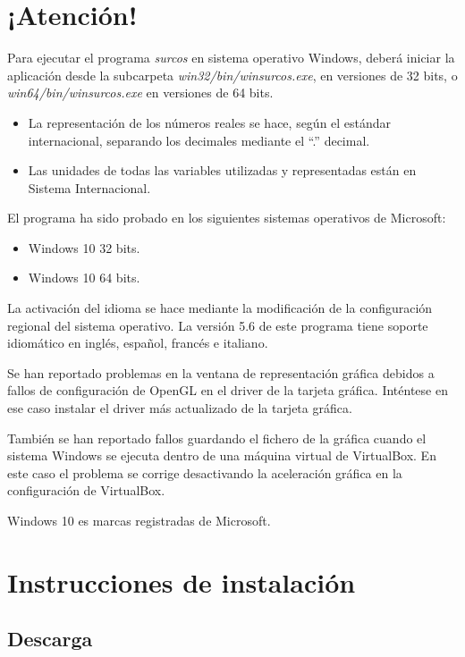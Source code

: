 \chapter*{¡Atención!}

Para ejecutar el programa \emph{surcos} en sistema operativo Windows, deberá
iniciar la aplicación desde la subcarpeta \emph{win32/bin/winsurcos.exe}, en
versiones de 32 bits, o \emph{win64/bin/winsurcos.exe} en versiones de 64 bits.

\begin{itemize}
\item La representación de los números reales se hace, según el estándar
internacional, separando los decimales mediante el ``.'' decimal.
\item Las unidades de todas las variables utilizadas y representadas están en
Sistema Internacional.
\end{itemize}

El programa ha sido probado en los siguientes sistemas operativos de Microsoft:
\begin{itemize}
\item Windows 10 32 bits.
\item Windows 10 64 bits.
\end{itemize}

La activación del idioma se hace mediante la modificación de la configuración
regional del sistema operativo. La versión 5.6 de este programa tiene soporte
idiomático en inglés, español, francés e italiano. 

Se han reportado problemas en la ventana de representación gráfica debidos a
fallos de configuración de OpenGL en el driver de la tarjeta gráfica. Inténtese
en ese caso instalar el driver más actualizado de la tarjeta gráfica.

También se han reportado fallos guardando el fichero de la gráfica cuando el
sistema Windows se ejecuta dentro de una máquina virtual de VirtualBox. En este
caso el problema se corrige desactivando la aceleración gráfica en la
configuración de VirtualBox.

Windows 10 es marcas registradas de Microsoft.

\setcounter{page}{1}

\chapter{Instrucciones de instalación}

\section{Descarga}

